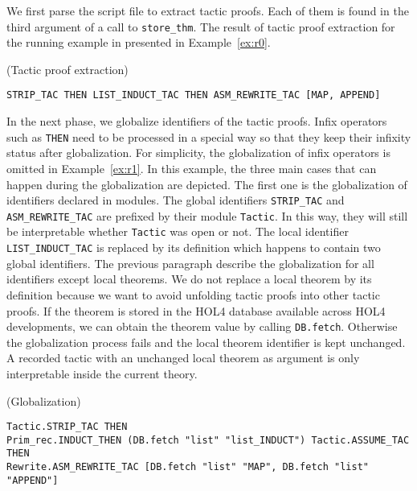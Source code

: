 \documentclass[runningheads,a4paper,draft]{svjour3}
\def\holfour{\textsf{HOL4}\xspace}
\begin{document}
We first parse the script file to extract tactic proofs. Each of them is found in
the third argument of a call to \texttt{store\_thm}. The result of tactic proof
extraction for the running example in presented in Example~\ref{ex:r0}.

\begin{example}\label{ex:r0}(Tactic proof extraction)
\small
\begin{lstlisting}[language=SMLSmall]
STRIP_TAC THEN LIST_INDUCT_TAC THEN ASM_REWRITE_TAC [MAP, APPEND]
\end{lstlisting}
\end{example}

In the next phase, we globalize identifiers of the tactic proofs.
Infix operators such as \texttt{THEN} need to be processed in a special way so
that they keep their infixity status after globalization. For simplicity,
the
globalization of infix operators is omitted in Example~\ref{ex:r1}.
In this example, the three main cases that can happen during the globalization
are depicted. The first one is the globalization of identifiers declared in
modules. The global identifiers \texttt{STRIP\_TAC} and
\texttt{ASM\_REWRITE\_TAC} are prefixed by their module \texttt{Tactic}. In
this way, they will still be interpretable whether \texttt{Tactic} was open or
not. The local identifier \texttt{LIST\_INDUCT\_TAC} is replaced by its
definition which happens to contain two global identifiers.
The previous paragraph describe the globalization for all identifiers except
local theorems.  We do not replace a local
theorem by its definition because we want to avoid unfolding tactic proofs into
other tactic proofs.
If the theorem is stored in the \holfour database available across \holfour
developments, we can obtain the theorem value by calling \texttt{DB.fetch}.
Otherwise the globalization process fails and the local theorem identifier is
kept unchanged. A recorded tactic with an unchanged local theorem as argument
is only interpretable inside the current theory.

\begin{example}\label{ex:r1} (Globalization)
\begin{lstlisting}[language=SMLSmall]
Tactic.STRIP_TAC THEN
Prim_rec.INDUCT_THEN (DB.fetch "list" "list_INDUCT") Tactic.ASSUME_TAC THEN
Rewrite.ASM_REWRITE_TAC [DB.fetch "list" "MAP", DB.fetch "list" "APPEND"]
\end{lstlisting}
\end{example}
\end{document}
